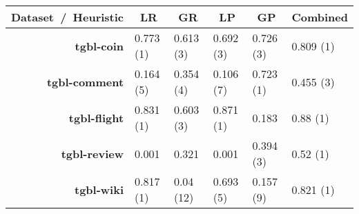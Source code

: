 
\begin{tabular}{@{}rlllll@{}}
\toprule
\multicolumn{1}{c}{\textbf{Dataset~/~Heuristic}} & \multicolumn{1}{c}{\textbf{LR}} & \multicolumn{1}{c}{\textbf{GR}} & \multicolumn{1}{c}{\textbf{LP}} & \multicolumn{1}{c}{\textbf{GP}} & \multicolumn{1}{c}{\textbf{Combined}} \\ \midrule
\textbf{tgbl-coin}                             & 0.773 (1)                       & 0.613 (3)                       & 0.692 (3)                       & 0.726 (3)                       & 0.809 (1)                             \\
\textbf{tgbl-comment}                          & 0.164 (5)                       & 0.354 (4)                       & 0.106 (7)                       & 0.723 (1)                       & 0.455 (3)                             \\
\textbf{tgbl-flight}                           & 0.831 (1)                       & 0.603 (3)                       & 0.871 (1)                       & 0.183                           & 0.88 (1)                              \\
\textbf{tgbl-review}                           & 0.001                           & 0.321                           & 0.001                           & 0.394     (3)                      & 0.52 (1)                              \\
\textbf{tgbl-wiki}                             & 0.817 (1)                   & 0.04 (12)                       & 0.693 (5)                       & 0.157 (9)                       & 0.821 (1)                             \\ \bottomrule
\end{tabular}